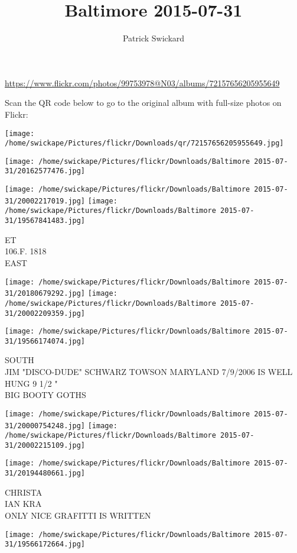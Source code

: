 \documentclass[10pt,letterpaper]{article}
\title{Baltimore 2015-07-31}
\author{Patrick Swickard}
\date{}
\begin{document}
\maketitle

\url{https://www.flickr.com/photos/99753978@N03/albums/72157656205955649}

Scan the QR code below to go to the original album with full-size photos on Flickr:

\texttt{[image: /home/swickape/Pictures/flickr/Downloads/qr/72157656205955649.jpg]}
\pagebreak

\texttt{[image: /home/swickape/Pictures/flickr/Downloads/Baltimore 2015-07-31/20162577476.jpg]}

\vspace{0.25in}
\texttt{[image: /home/swickape/Pictures/flickr/Downloads/Baltimore 2015-07-31/20002217019.jpg]}
\texttt{[image: /home/swickape/Pictures/flickr/Downloads/Baltimore 2015-07-31/19567841483.jpg]}

ET\\
106.F. 1818\\
EAST
\pagebreak

\texttt{[image: /home/swickape/Pictures/flickr/Downloads/Baltimore 2015-07-31/20180679292.jpg]}
\texttt{[image: /home/swickape/Pictures/flickr/Downloads/Baltimore 2015-07-31/20002209359.jpg]}

\vspace{0.25in}
\texttt{[image: /home/swickape/Pictures/flickr/Downloads/Baltimore 2015-07-31/19566174074.jpg]}

SOUTH\\
JIM "DISCO{-}DUDE" SCHWARZ TOWSON MARYLAND 7/9/2006 IS WELL HUNG 9 1/2 "\\
BIG BOOTY GOTHS
\pagebreak

\texttt{[image: /home/swickape/Pictures/flickr/Downloads/Baltimore 2015-07-31/20000754248.jpg]}
\texttt{[image: /home/swickape/Pictures/flickr/Downloads/Baltimore 2015-07-31/20002215109.jpg]}

\texttt{[image: /home/swickape/Pictures/flickr/Downloads/Baltimore 2015-07-31/20194480661.jpg]}

CHRISTA\\
IAN KRA\\
ONLY NICE GRAFITTI IS WRITTEN
\pagebreak

\texttt{[image: /home/swickape/Pictures/flickr/Downloads/Baltimore 2015-07-31/19566172664.jpg]}
\end{document}
